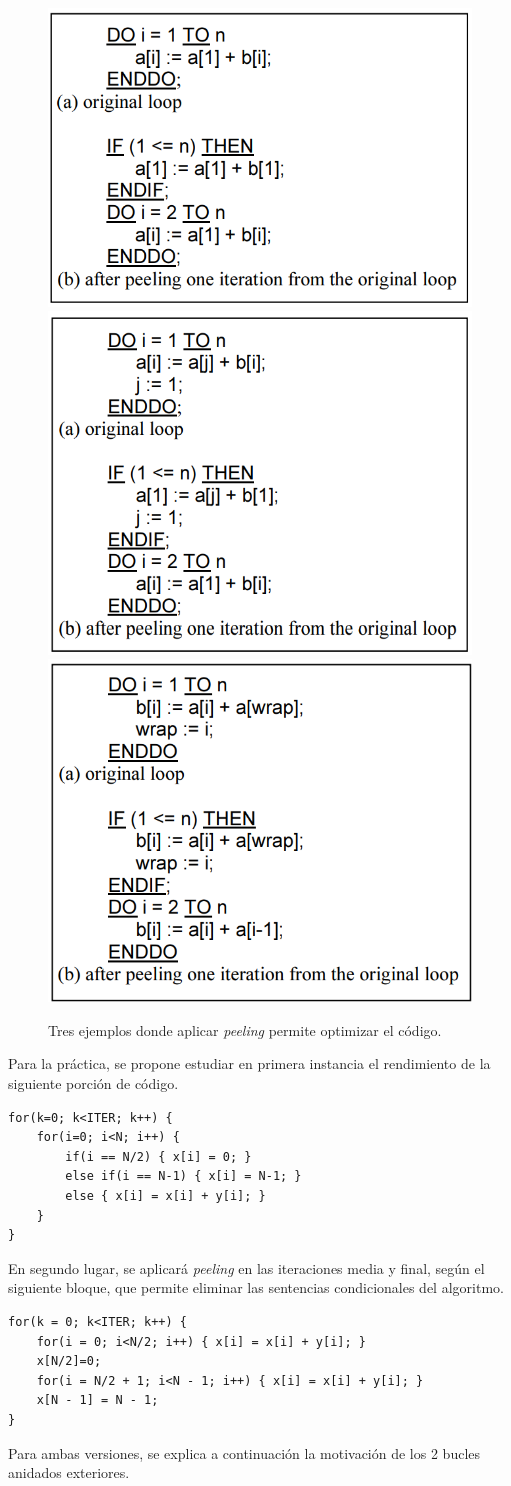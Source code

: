 \documentclass[11pt,a4paper,twoside]{article}
\theoremstyle{definition}
\begin{document}
	\begin{figure} [H] \centering
		\includegraphics[width=.31\textwidth]{art1.png}
		\includegraphics[width=.31\textwidth]{art2.png}
		\includegraphics[width=.31\textwidth]{art3.png}
		\caption{Tres ejemplos donde aplicar \textit{peeling} permite optimizar el código.}
		\label{fig:art1}
	\end{figure}
	
	Para la práctica, se propone estudiar en primera instancia el rendimiento de la siguiente porción de código.
	
	\begin{verbatim}
for(k=0; k<ITER; k++) {
	for(i=0; i<N; i++) {
		if(i == N/2) { x[i] = 0; }
		else if(i == N-1) { x[i] = N-1; }
		else { x[i] = x[i] + y[i]; }
	}
}
	\end{verbatim}

	En segundo lugar, se aplicará \textit{peeling} en las iteraciones media y final, según el siguiente bloque, que permite eliminar las sentencias condicionales del algoritmo.
	
	\begin{verbatim}
for(k = 0; k<ITER; k++) {
	for(i = 0; i<N/2; i++) { x[i] = x[i] + y[i]; }
	x[N/2]=0;
	for(i = N/2 + 1; i<N - 1; i++) { x[i] = x[i] + y[i]; }
	x[N - 1] = N - 1;
}
	\end{verbatim}
	
	Para ambas versiones, se explica a continuación la motivación de los 2 bucles anidados exteriores.
	
\end{document}
